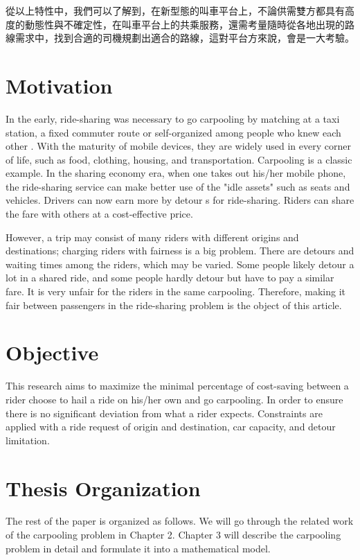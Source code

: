 從以上特性中，我們可以了解到，在新型態的叫車平台上，不論供需雙方都具有高度的動態性與不確定性，在叫車平台上的共乘服務，還需考量隨時從各地出現的路線需求中，找到合適的司機規劃出適合的路線，這對平台方來說，會是一大考驗。

\section{Motivation}

In the early, ride-sharing was necessary to go carpooling by matching at a taxi station, a fixed commuter route or self-organized among people who knew each other \cite{chan_ridesharing_2012}. With the maturity of mobile devices, they are widely used in every corner of life, such as food, clothing, housing, and transportation. Carpooling is a classic example. In the sharing economy era, when one takes out his/her mobile phone, the ride-sharing service can make better use of the "idle assets" such as seats and vehicles. Drivers can now earn more by detour s for ride-sharing. Riders can share the fare with others at a cost-effective price.

However, a trip may consist of many riders with different origins and destinations; charging riders with fairness is a big problem. There are detours and waiting times among the riders, which may be varied. Some people likely detour a lot in a shared ride, and some people hardly detour but have to pay a similar fare. It is very unfair for the riders in the same carpooling. Therefore, making it fair between passengers in the ride-sharing problem is the object of this article.

\section{Objective}

This research aims to maximize the minimal percentage of cost-saving between a rider choose to hail a ride on his/her own and go carpooling. In order to ensure there is no significant deviation from what a rider expects. Constraints are applied with a ride request of origin and destination, car capacity, and detour limitation.

\section{Thesis Organization}

The rest of the paper is organized as follows. We will go through the related work of the carpooling problem in Chapter 2. Chapter 3 will describe the carpooling problem in detail and formulate it into a mathematical model.